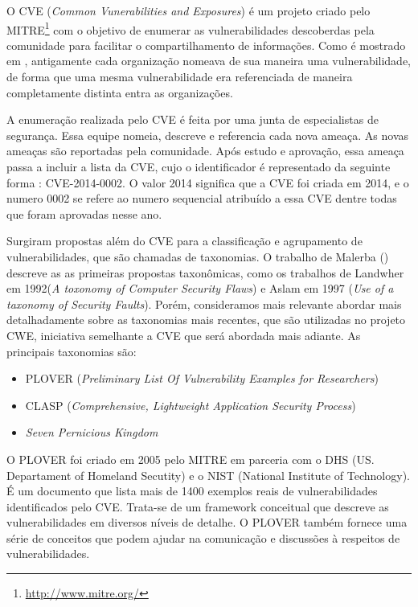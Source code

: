 %

O CVE (\emph{Common Vunerabilities and Exposures}) é um projeto criado pelo MITRE\footnote{\url{http://www.mitre.org/}} com o objetivo de enumerar as vulnerabilidades descoberdas pela comunidade para facilitar o compartilhamento de informações. Como é mostrado em \cite{cve2001martin}, antigamente cada organização nomeava de sua maneira uma vulnerabilidade, de forma que uma mesma vulnerabilidade era referenciada de maneira completamente distinta entra as organizações. 

%

A enumeração realizada pelo CVE é feita por uma junta de especialistas 	de segurança. Essa equipe nomeia, descreve e referencia cada nova ameaça. As novas ameaças são reportadas pela comunidade. Após estudo e aprovação, essa ameaça passa a incluir a lista da CVE, cujo o identificador é representado da seguinte forma : CVE-2014-0002. O valor 2014 significa que a CVE foi criada em 2014, e o numero 0002 se refere ao numero sequencial atribuído a essa CVE dentre todas que foram aprovadas nesse ano.

%

Surgiram propostas além do CVE para a classificação e agrupamento de vulnerabilidades, que são chamadas de taxonomias. O trabalho de Malerba (\citeyear{malerba2010}) descreve as as primeiras propostas taxonômicas, como os trabalhos de Landwher em 1992(\emph{A toxonomy of Computer Security Flaws}) e Aslam em 1997 (\emph{Use of  a taxonomy of Security Faults}). Porém, consideramos mais relevante abordar mais detalhadamente sobre as taxonomias mais recentes, que são utilizadas no projeto CWE, iniciativa semelhante a CVE que será abordada mais adiante. As principais taxonomias são:

%

\begin{itemize}
\item PLOVER (\emph{Preliminary List Of Vulnerability Examples for Researchers})
\item CLASP (\emph{Comprehensive, Lightweight Application Security Process})
\item \emph{Seven Pernicious Kingdom}
\end{itemize}

%

O PLOVER foi criado em 2005 pelo MITRE em parceria com o DHS (US. Departament of Homeland Secutity) e o NIST (National Institute of Technology). É um documento que lista mais de 1400 exemplos reais de vulnerabilidades identificados pelo CVE. Trata-se de um framework conceitual que descreve as vulnerabilidades em diversos níveis de detalhe. O PLOVER também fornece uma série de conceitos que podem ajudar na comunicação e discussões à respeitos de vulnerabilidades.

